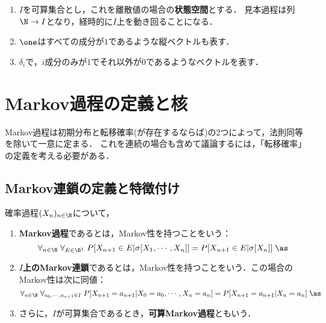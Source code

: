\documentclass[uplatex,dvipdfmx]{jsreport}
\begin{document}
\begin{notation}\mbox{}
    \begin{enumerate}
        \item $I$を可算集合とし，これを離散値の場合の\textbf{状態空間}とする．
        見本過程は列$\N\to I$となり，経時的に$I$上を動き回ることになる．
        \item $\one$はすべての成分が$1$であるような縦ベクトルも表す．
        \item $\delta_i$で，$i$成分のみが$1$でそれ以外が$0$であるようなベクトルを表す．
    \end{enumerate}
\end{notation}

\section{Markov過程の定義と核}

\begin{tcolorbox}[colframe=ForestGreen, colback=ForestGreen!10!white,breakable,colbacktitle=ForestGreen!40!white,coltitle=black,fonttitle=\bfseries\sffamily,
title=]
    Markov過程は初期分布と転移確率(が存在するならば)の2つによって，法則同等を除いて一意に定まる．
    これを連続の場合も含めて議論するには，「転移確率」の定義を考える必要がある．
\end{tcolorbox}

\subsection{Markov連鎖の定義と特徴付け}

\begin{definition}\label{def-Markov-chain}
    確率過程$(X_n)_{n\in\N}$について，
    \begin{enumerate}
        \item \textbf{Markov過程}であるとは，Markov性を持つことをいう：
        \[\forall_{n\in\N}\;\forall_{E\in\B^1}\;P[X_{n+1}\in E|\sigma[X_1,\cdots,X_n]]=P[X_{n+1}\in E|\sigma[X_n]]\;\as\]
        \item \textbf{$I$上のMarkov連鎖}であるとは，Markov性を持つことをいう．この場合のMarkov性は次に同値：
        \[\forall_{n\in\N}\;\forall_{a_0,\cdots,a_{n+1}\in I}\;P[X_{n+1}=a_{n+1}|X_0=a_0,\cdots,X_n=a_n]=P[X_{n+1}=a_{n+1}|X_n=a_n]\;\as\]
        \item さらに，$I$が可算集合であるとき，\textbf{可算Markov過程}ともいう\cite{Popov21-RandomWalk}．
    \end{enumerate}
\end{definition}
\end{document}
